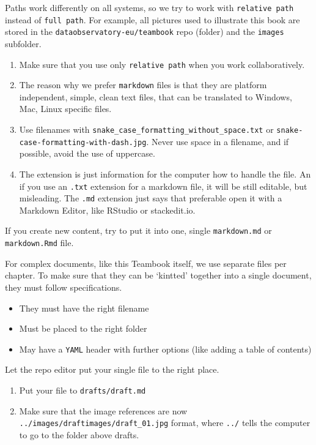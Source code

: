 \documentclass[
  a4paper,
  openany, a4paper, oneside]{book}
\providecommand{\tightlist}{%
  \setlength{\itemsep}{0pt}\setlength{\parskip}{0pt}}
\begin{document}
Paths work differently on all systems, so we try to work with \texttt{relative\ path} instead of \texttt{full\ path}. For example, all pictures used to illustrate this book are stored in the \texttt{dataobservatory-eu/teambook} repo (folder) and the \texttt{images} subfolder.

\begin{enumerate}
\def\labelenumi{\arabic{enumi}.}
\item
  Make sure that you use only \texttt{relative\ path} when you work collaboratively.
\item
  The reason why we prefer \texttt{markdown} files is that they are platform independent, simple, clean text files, that can be translated to Windows, Mac, Linux specific files.
\item
  Use filenames with \texttt{snake\_case\_formatting\_without\_space.txt} or \texttt{snake-case-formatting-with-dash.jpg}. Never use space in a filename, and if possible, avoid the use of uppercase.
\item
  The extension is just information for the computer how to handle the file. An if you use an \texttt{.txt} extension for a markdown file, it will be still editable, but misleading. The \texttt{.md} extension just says that preferable open it with a Markdown Editor, like RStudio or stackedit.io.
\end{enumerate}

If you create new content, try to put it into one, single \texttt{markdown.md} or \texttt{markdown.Rmd} file.

For complex documents, like this Teambook itself, we use separate files per chapter. To make sure that they can be `kintted' together into a single document, they must follow specifications.

\begin{itemize}
\tightlist
\item
  They must have the right filename
\item
  Must be placed to the right folder
\item
  May have a \texttt{YAML} header with further options (like adding a table of contents)
\end{itemize}

Let the repo editor put your single file to the right place.

\begin{enumerate}
\def\labelenumi{\arabic{enumi}.}
\tightlist
\item
  Put your file to \texttt{drafts/draft.md}
\item
  Make sure that the image references are now \texttt{../images/draftimages/draft\_01.jpg} format, where \texttt{../} tells the computer to go to the folder above drafts.
\end{enumerate}
\end{document}
